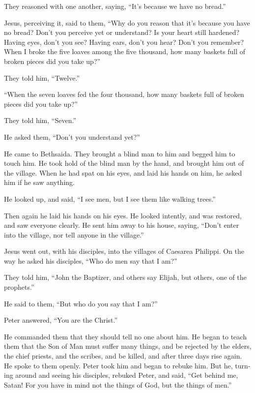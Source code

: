 \begin{paracol}{2}
\begin{otherlanguage}{english}
 They reasoned with one another, saying, ``It's because
we have no bread.''

 Jesus, perceiving it, said to them, ``Why do you reason
that it's because you have no bread? Don't you perceive yet or
understand? Is your heart still hardened?  Having eyes,
don't you see? Having ears, don't you hear? Don't you remember?
 When I broke the five loaves among the five thousand,
how many baskets full of broken pieces did you take up?''

They told him, ``Twelve.''

 ``When the seven loaves fed the four thousand, how many
baskets full of broken pieces did you take up?''

They told him, ``Seven.''

 He asked them, ``Don't you understand yet?''

 He came to Bethsaida. They brought a blind man to him
and begged him to touch him.  He took hold of the blind
man by the hand, and brought him out of the village. When he had spat on
his eyes, and laid his hands on him, he asked him if he saw anything.

 He looked up, and said, ``I see men, but I see them like
walking trees.''

 Then again he laid his hands on his eyes. He looked
intently, and was restored, and saw everyone clearly.  He
sent him away to his house, saying, ``Don't enter into the village, nor
tell anyone in the village.''

 Jesus went out, with his disciples, into the villages of
Caesarea Philippi. On the way he asked his disciples, ``Who do men say
that I am?''

 They told him, ``John the Baptizer, and others say
Elijah, but others, one of the prophets.''

 He said to them, ``But who do you say that I am?''

Peter answered, ``You are the Christ.''

 He commanded them that they should tell no one about
him.  He began to teach them that the Son of Man must
suffer many things, and be rejected by the elders, the chief priests,
and the scribes, and be killed, and after three days rise again.
 He spoke to them openly. Peter took him and began to
rebuke him.  But he, turning around and seeing his
disciples, rebuked Peter, and said, ``Get behind me, Satan! For you have
in mind not the things of God, but the things of men.''


\end{otherlanguage}
\end{paracol}
